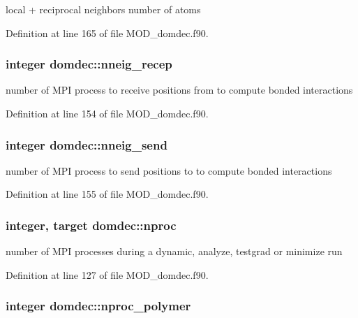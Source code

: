 local + reciprocal neighbors number of atoms 



Definition at line 165 of file M\-O\-D\-\_\-domdec.\-f90.

\hypertarget{classdomdec_a364fed03b8d34d58abb5a2b4708ea05f}{
\subsubsection[{nneig\-\_\-recep}]{\setlength{\rightskip}{0pt plus 5cm}integer domdec\-::nneig\-\_\-recep}}\label{classdomdec_a364fed03b8d34d58abb5a2b4708ea05f}


number of M\-P\-I process to receive positions from to compute bonded interactions 



Definition at line 154 of file M\-O\-D\-\_\-domdec.\-f90.

\hypertarget{classdomdec_afa246e161fb21768b484c151b3866631}{
\subsubsection[{nneig\-\_\-send}]{\setlength{\rightskip}{0pt plus 5cm}integer domdec\-::nneig\-\_\-send}}\label{classdomdec_afa246e161fb21768b484c151b3866631}


number of M\-P\-I process to send positions to to compute bonded interactions 



Definition at line 155 of file M\-O\-D\-\_\-domdec.\-f90.

\hypertarget{classdomdec_ad386ac278e357dd9bc1034b2b3cc04fc}{
\subsubsection[{nproc}]{\setlength{\rightskip}{0pt plus 5cm}integer, target domdec\-::nproc}}\label{classdomdec_ad386ac278e357dd9bc1034b2b3cc04fc}


number of M\-P\-I processes during a dynamic, analyze, testgrad or minimize run 



Definition at line 127 of file M\-O\-D\-\_\-domdec.\-f90.

\hypertarget{classdomdec_a26e164f3a2e4deb7d3019cca4530085b}{
\subsubsection[{nproc\-\_\-polymer}]{\setlength{\rightskip}{0pt plus 5cm}integer domdec\-::nproc\-\_\-polymer}}\label{classdomdec_a26e164f3a2e4deb7d3019cca4530085b}


